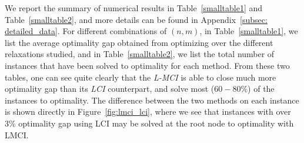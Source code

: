 We report the summary of numerical results in Table~\ref{smalltable1} and Table~\ref{smalltable2}, and more details can be found in Appendix~\ref{subsec: detailed_data}.
For different combinations of $(n,m)$,
in Table~\ref{smalltable1}, we list the average optimality gap obtained from optimizing over the different relaxations studied, and in Table~\ref{smalltable2}, we list the total number of instances that have been solved to optimality for each method.
From these two tables, one can see quite clearly that the \emph{L-MCI} is able to close much more optimality gap than its \emph{LCI} counterpart, and solve most ($60-80\%$) of the instances to optimality.  The difference between the two methods on each instance is shown directly in  Figure~\ref{fig:lmci_lci}, where we see that instances with over 3\% optimality gap using LCI may be solved at the root node to optimality with LMCI.

